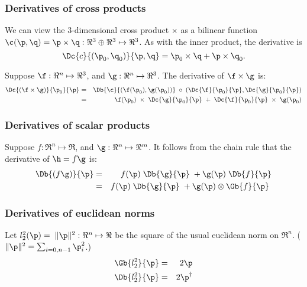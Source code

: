
\subsubsection{Derivatives of cross products}
\label{sec:cross}

We can view the 3-dimensional cross product
$ \times $
as a bilinear function
$\c(\p,\q) = \p \times \q : \Re^3 \oplus \Re^3 \mapsto \Re^3$.
As with the inner product,
the derivative is
\begin{equation}
\Dc{c}{(\p_0,\q_0)}{\p,\q} = \p_0 \times \q + \p \times \q_0.
\end{equation}

Suppose
$\f:\Re^{n} \mapsto \Re^3$, and
$\g:\Re^{n} \mapsto \Re^3$.
The derivative of $\f \times \g$ is:
\begin{eqnarray}
\Dc{(\f \times \g)}{\p_0}{\p}
& =
& \Db{\c}{(\f(\p_0),\g(\p_0))} \;\circ \;(\Dc{\f}{\p_0}{\p}, \Dc{\g}{\p_0}{\p})
\\
& =
& \f(\p_0) \;\times \;\Dc{\g}{\p_0}{\p} \;+ \;\Dc{\f}{\p_0}{\p} \;\times \;\g(\p_0) \nonumber
\end{eqnarray}


\subsubsection{Derivatives of scalar products}
\label{sec:scalar}

Suppose
$f:\Re^{n} \mapsto \Re$, and
$\g:\Re^{n} \mapsto \Re^m$.
It follows from the chain rule that the derivative of $\h = f\g$ is:
\begin{eqnarray}
\label{eq:scalar_product_derivative}
\Db{(f\g)}{\p}
& = & f(\p) \;\Db{\g}{\p} \;+ \g(\p) \; \Db{f}{\p}  \\
& = & f(\p) \;\Db{\g}{\p} \;+ \g(\p) \otimes \Gb{f}{\p} \; \nonumber
\end{eqnarray}



\subsubsection{Derivatives of euclidean norms}
\label{sec:norms}

Let $l_2^2(\p) = \; \| \p  \|^2 : \Re^n \mapsto \Re$
be the square of the usual euclidean norm on $\Re^n$.
($ \| \p  \|^2  = \sum_{i=0,n-1} \p_i^2$.)
\begin{eqnarray}
\label{eq:l2-gradient}
\Gb{l_2^2}{\p} & = & 2\p \\
\Db{l_2^2}{\p} & = & 2\p^\dagger
\end{eqnarray}

